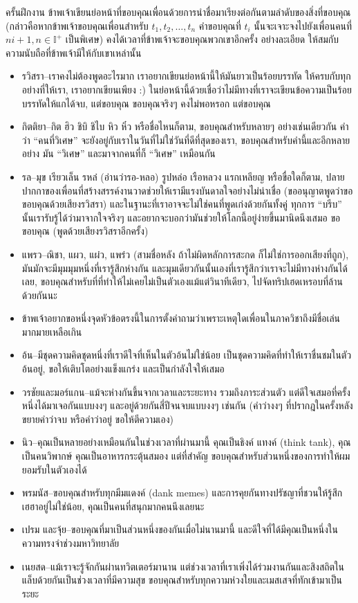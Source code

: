 ครั้นฝึกงาน ข้าพเจ้าเขียนย่อหน้าที่ขอบคุณเพื่อนด้วยการนำชื่อมาเรียงต่อกันตามลำดับของสิ่งที่ขอบคุณ (กล่าวคือหากข้าพเจ้าขอบคุณเพื่อนสำหรับ \(t_1, t_2, \dots, t_n\) คำขอบคุณที่ \(t_i\) นั้นจะเจาะจงไปยังเพื่อนคนที่ \(ni+1, n \in \mathbb{I}^+\) เป็นพิเศษ) คงได้เวลาที่ข้าพเจ้าจะขอบคุณพวกเขาอีกครั้ง อย่างละเอียด ให้สมกับความนับถือที่ข้าพเจ้ามีให้กับเขาเหล่านั้น
\begin{itemize}
    \item รวิสรา--เราคงไม่ต้องพูดอะไรมาก เราอยากเขียนย่อหน้านี้ให้มันยาวเป็นร้อยบรรทัด ให้ครบกับทุกอย่างที่ให้เรา, เราอยากเขียนเพียง :) ในย่อหน้านี้ด้วยเชื่อว่าไม่มีทางที่เราจะเขียนข้อความเป็นร้อยบรรทัดให้แกได้จบ, แต่ขอบคุณ ขอบคุณจริงๆ คงไม่พอหรอก แต่ขอบคุณ
    \item กิตติยา--กิต ฮิว ชิบิ ชิไบ หิว หิ๋ว หรือชื่อไหนก็ตาม, ขอบคุณสำหรับหลายๆ อย่างเช่นเดียวกัน คำว่า ``คนที่วิเศษ'' จะยังอยู่กับเราในวันที่ไม่ใช่วันที่ดีที่สุดของเรา, ขอบคุณสำหรับคำนี้และอีกหลายอย่าง มัน ``วิเศษ'' และมาจากคนที่ก็ ``วิเศษ'' เหมือนกัน
    \item รล--มุข เรียวเล็น รหล๋ (อ่านว่ารอ-หลอ) รูปหล่อ เรือหลวง แรกเหลียญ หรือขื่อใดก็ตาม, ปลายปากกาของเพื่อนที่สร้างสรรค์งานวาดช่วยให้เรามีแรงบันดาลใจอย่างไม่น่าเชื่อ (ขออนุญาตพูดว่าขอขอบคุณด้วยเสียงรวิสรา) และในฐานะที่เราอาจจะไม่ใช่คนที่พูดเก่งด้วยกันทั้งคู่ ทุกการ ``บรีบ'' นั้นเรารับรู้ได้ว่ามาจากใจจริงๆ และอยากจะบอกว่ามันช่วยให้โลกนี้อยู่ง่ายขึ้นมานิดนึงเสมอ ขอขอบคุณ (พูดด้วยเสียงรวิสราอีกครั้ง)
    \item แพรว--ณิชา, แผว, แผ๋ว, แพร๋ว (สามชื่อหลัง ถ้าไม่ผิดหลักการสะกด ก็ไม่ใช่การออกเสียงที่ถูก), มันมักจะมีมุมมุมหนึ่งที่เรารู้สึกห่างกัน และมุมเดียวกันนั้นเองที่เรารู้สึกว่าเราจะไม่มีทางห่างกันได้เลย, ขอบคุณสำหรับที่ที่ทำให้ไม่เคยไม่เป็นตัวเองแม้แต่วินาทีเดียว, ไปจัดทริปเฮดเหรอบที่ล้านด้วยกันนะ
    \item ข้าพเจ้าอยากขอหนึ่งจุดหัวข้อตรงนี้ในการตั้งคำถามว่าเพราะเหตุใดเพื่อนในภาควิชาถึงมีชื่อเล่นมากมายเหลือเกิน
    \item อ้น--มีชุดความคิดชุดหนึ่งที่เราดีใจที่เห็นในตัวอ้นไม่ใช่น้อย เป็นชุดความคิดที่ทำให้เราชื่นชมในตัวอ้นอยู่, ขอให้เติบโตอย่างแข็งแกร่ง และเป็นกำลังใจให้เสมอ
    \item วรชัยและมอร์แกน--แม้จะห่างกันขึ้นจากเวลาและระยะทาง รวมถึงภาระส่วนตัว แต่ดีใจเสมอที่ครั้งหนึ่งได้มาเจอกันแบบงงๆ และอยู่ด้วยกันสี่ปีจนจบแบบงงๆ เช่นกัน (คำว่างงๆ ที่ปรากฎในครั้งหลัง ขยายคำว่าจบ หรือคำว่าอยู่ ขอให้ตีความเอง)
    \item นิว--คุณเป็นหลายอย่างเหมือนกันในช่วงเวลาที่ผ่านมานี้ คุณเป็นธิงค์ แทงค์ (think tank), คุณเป็นคนวิพากษ์ คุณเป็นอาหารกระตุ้นสมอง แต่ที่สำคัญ ขอบคุณสำหรับส่วนหนึ่งของการทำให้ผมยอมรับในตัวเองได้
    \item พรมนัส--ขอบคุณสำหรับทุกมีมแดงค์ (dank memes) และการคุยกันทางปรัชญาที่ชวนให้รู้สึกเฮฮาอยู่ไม่ใช่น้อย, คุณเป็นคนที่สนุกมากคนนึงเลยนะ
    \item เปรม และจุ้ย--ขอบคุณที่มาเป็นส่วนหนึ่งของกันเมื่อไม่นานมานี้ และดีใจที่ได้มีคุณเป็นหนึ่งในความทรงจำช่วงมหาวิทยาลัย
    \item เนยสด--แม้เราจะรู้จักกันผ่านทวิตเตอร์มานาน แต่ช่วงเวลาที่เราเพิ่งได้ร่วมงานกันและสิงสถิตในแล็บด้วยกันเป็นช่วงเวลาที่มีความสุข ขอบคุณสำหรับทุกความห่วงใยและเมสเสจที่ทักเข้ามาเป็นระยะ
\end{itemize}
